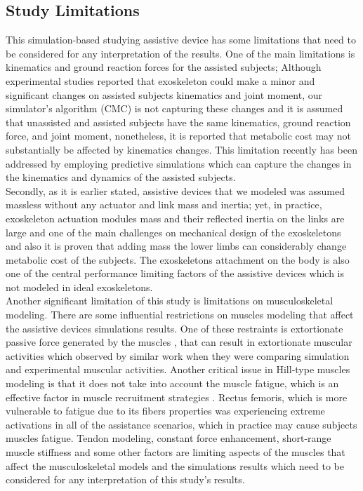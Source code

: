 \documentclass[10pt,letterpaper]{article}
\begin{document}
\subsection*{Study Limitations}
This simulation-based studying assistive device has some limitations that need to be considered for any interpretation of the results. One of the main limitations is kinematics and ground reaction forces for the assisted subjects; Although experimental studies reported that exoskeleton could make a minor \cite{42,79,91,114,115,116} and significant \cite{80,117,118,119} changes on assisted subjects kinematics and joint moment, our simulator's algorithm (CMC) is not capturing these changes and it is assumed that unassisted and assisted subjects have the same kinematics, ground reaction force, and joint moment, nonetheless, it is reported that metabolic cost may not substantially be affected by kinematics changes\cite{120}. This limitation recently has been addressed by employing predictive simulations which can capture the changes in the kinematics and dynamics of the assisted subjects.\\  
Secondly, as it is earlier stated, assistive devices that we modeled was assumed massless without any actuator and link mass and inertia; yet, in practice, exoskeleton actuation modules mass and their reflected inertia on the links are large and one of the main challenges on mechanical design of the exoskeletons and also it is proven that adding mass the lower limbs can considerably change metabolic cost of the subjects. The exoskeletons attachment on the body is also one of the central performance limiting factors of the assistive devices \cite{121} which is not modeled in ideal exoskeletons.\\
Another significant limitation of this study is limitations on musculoskeletal modeling. There are some influential restrictions on muscles modeling that affect the assistive devices simulations results. One of these restraints is extortionate passive force generated by the muscles \cite{92}, that can result in extortionate muscular activities which observed by similar work \cite{93} when they were comparing simulation and experimental muscular activities. Another critical issue in Hill-type muscles modeling is that it does not take into account the muscle fatigue, which is an effective factor in muscle recruitment strategies \cite{92}. Rectus femoris, which is more vulnerable to fatigue due to its fibers properties \cite{123} was experiencing extreme activations in all of the assistance scenarios, which in practice may cause subjects muscles fatigue\cite{122}. Tendon modeling, constant force enhancement, short-range muscle stiffness and some other factors \cite{92} are limiting aspects of the muscles that affect the musculoskeletal models and the simulations results which need to be considered for any interpretation of this study's results.\\
\end{document}
